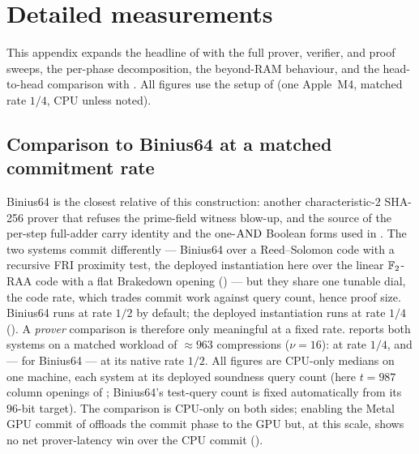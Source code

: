 \section{Detailed measurements}
\label{app:meas}

This appendix expands the headline of  with the full prover,
verifier, and proof sweeps, the per-phase decomposition, the beyond-RAM
behaviour, and the head-to-head comparison with \binius{}. All figures use the
setup of  (one Apple~M4, matched rate $1/4$, CPU unless noted).

\subsection{Comparison to Binius64 at a matched commitment rate}
\label{sec:impl-binius}

Binius64 is the closest relative of this construction: another
characteristic-$2$ SHA-256 prover that refuses the prime-field witness
blow-up, and the source of the per-step full-adder carry identity and the
one-$\operatorname{AND}$ Boolean forms used in . The two systems commit
differently --- Binius64 over a Reed--Solomon code with a recursive FRI
proximity test, the deployed instantiation here over the linear $\mathbb{F}_2$-RAA
code with a flat Brakedown opening () --- but they
share one tunable dial, the code rate, which trades commit work against
query count, hence proof size. Binius64 runs at rate $1/2$ by default; the
deployed instantiation runs at rate $1/4$ (). A
\emph{prover} comparison is therefore only meaningful at a fixed rate.
 reports both systems on a matched workload of
$\approx\!963$ compressions ($\nu=16$): at rate $1/4$, and --- for Binius64
--- at its native rate $1/2$. All figures are CPU-only medians on one
machine, each system at its deployed soundness query count (here $t=987$
column openings of ; Binius64's test-query count is
fixed automatically from its $96$-bit target). The comparison is CPU-only
on both sides; enabling the Metal GPU commit of 
offloads the commit phase to the GPU but, at this scale, shows no net
prover-latency win over the CPU commit ().

